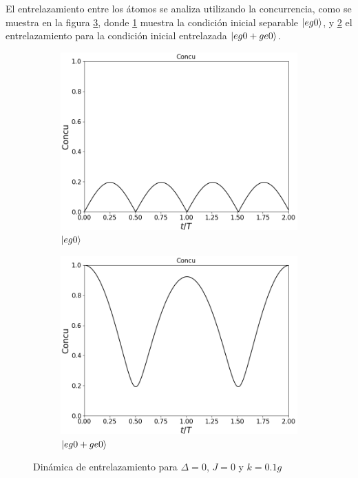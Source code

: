 El entrelazamiento entre los átomos se analiza utilizando la concurrencia, como se muestra en la figura \ref{fig4:concu k}, donde \ref{fig4:concu k eg0} muestra la condición inicial separable $\ket{eg0}$, y \ref{fig4:concu k eg0 sim} el entrelazamiento para la condición inicial entrelazada $\ket{eg0+ge0}$. 
\begin{figure}[h]
    \centering
    \begin{subfigure}{0.49\textwidth}
        \includegraphics[width=\textwidth]{figuras/ch4/k eg0 concu.png}
        \caption{$\ket{eg0}$}
        \label{fig4:concu k eg0}
    \end{subfigure}
    \hfill
    \begin{subfigure}{0.49\textwidth}
        \includegraphics[width=\textwidth]{figuras/ch4/k eg0+ concu.png}
        \caption{$\ket{eg0+ge0}$}
        \label{fig4:concu k eg0 sim}
    \end{subfigure}
    \caption{Dinámica de entrelazamiento para $\Delta=0$, $J=0$ y $k=0.1g$}
    \label{fig4:concu k}
\end{figure}

